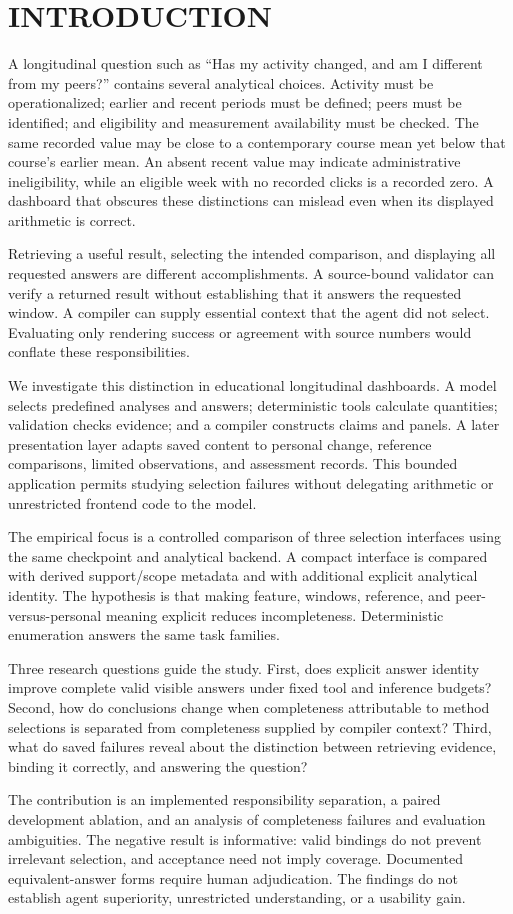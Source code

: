 \section{\uppercase{Introduction}}
\label{sec:intro}
\noindent A longitudinal question such as ``Has my activity changed, and am I different from my peers?'' contains several analytical choices. Activity must be operationalized; earlier and recent periods must be defined; peers must be identified; and eligibility and measurement availability must be checked. The same recorded value may be close to a contemporary course mean yet below that course's earlier mean. An absent recent value may indicate administrative ineligibility, while an eligible week with no recorded clicks is a recorded zero. A dashboard that obscures these distinctions can mislead even when its displayed arithmetic is correct.\draftassist

Retrieving a useful result, selecting the intended comparison, and displaying all requested answers are different accomplishments. A source-bound validator can verify a returned result without establishing that it answers the requested window. A compiler can supply essential context that the agent did not select. Evaluating only rendering success or agreement with source numbers would conflate these responsibilities.

We investigate this distinction in educational longitudinal dashboards. A model selects predefined analyses and answers; deterministic tools calculate quantities; validation checks evidence; and a compiler constructs claims and panels. A later presentation layer adapts saved content to personal change, reference comparisons, limited observations, and assessment records. This bounded application permits studying selection failures without delegating arithmetic or unrestricted frontend code to the model.

The empirical focus is a controlled comparison of three selection interfaces using the same checkpoint and analytical backend. A compact interface is compared with derived support/scope metadata and with additional explicit analytical identity. The hypothesis is that making feature, windows, reference, and peer-versus-personal meaning explicit reduces incompleteness. Deterministic enumeration answers the same task families.

Three research questions guide the study. First, does explicit answer identity improve complete valid visible answers under fixed tool and inference budgets? Second, how do conclusions change when completeness attributable to method selections is separated from completeness supplied by compiler context? Third, what do saved failures reveal about the distinction between retrieving evidence, binding it correctly, and answering the question?

The contribution is an implemented responsibility separation, a paired development ablation, and an analysis of completeness failures and evaluation ambiguities. The negative result is informative: valid bindings do not prevent irrelevant selection, and acceptance need not imply coverage. Documented equivalent-answer forms require human adjudication. The findings do not establish agent superiority, unrestricted understanding, or a usability gain.
